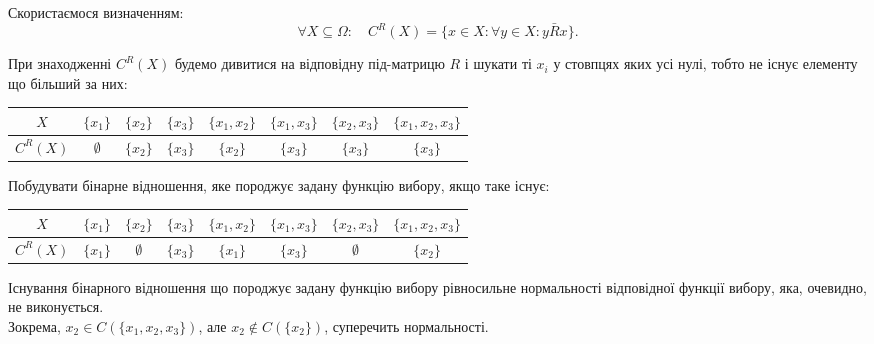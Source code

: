\begin{solution}
    Скористаємося визначенням: \[ \forall X \subseteq \Omega: \quad C^R(X) = \{ x \in X: \forall y \in X: y \bar R x \}.\]

    При знаходженні $C^R(X)$ будемо дивитися на відповідну під-матрицю $R$ і шукати ті $x_i$ у стовпцях яких усі нулі, тобто не існує елементу що більший за них:
    \begin{table}[H]
        \centering
        \begin{tabular}{|c|c|c|c|c|c|c|c|}
            \hline
            $X$ & $\{x_1\}$ & $\{x_2\}$ & $\{x_3\}$ & $\{x_1, x_2\}$ & $\{x_1, x_3\}$ & $\{x_2, x_3\}$ & $\{x_1, x_2, x_3\}$ \\ \hline
            $C^R(X)$ & $\emptyset$ & $\{x_2\}$ & $\{x_3\}$ & $\{x_2\}$ & $\{x_3\}$ & $\{x_3\}$ & $\{x_3\}$ \\ \hline
        \end{tabular}
    \end{table}
\end{solution}

\newpage

\begin{problem*}[класна]
    Побудувати бінарне відношення, яке породжує задану функцію вибору, якщо таке існує:
    \begin{table}[H]
        \centering
        \begin{tabular}{|c|c|c|c|c|c|c|c|}
            \hline
            $X$ & $\{x_1\}$ & $\{x_2\}$ & $\{x_3\}$ & $\{x_1, x_2\}$ & $\{x_1, x_3\}$ & $\{x_2, x_3\}$ & $\{x_1, x_2, x_3\}$ \\ \hline
            $C^R(X)$ & $\{x_1\}$ & $\emptyset$ & $\{x_3\}$ & $\{x_1\}$ & $\{x_3\}$ & $\emptyset$ & $\{x_2\}$ \\ \hline
        \end{tabular}
    \end{table}
\end{problem*}

\begin{solution}
    Існування бінарного відношення що породжує задану функцію вибору рівносильне нормальності відповідної функції вибору, яка, очевидно, не виконується. \\
    
    Зокрема, $x_2 \in C(\{x_1, x_2, x_3\})$, але $x_2 \notin C(\{x_2\})$, суперечить нормальності.
\end{solution}

